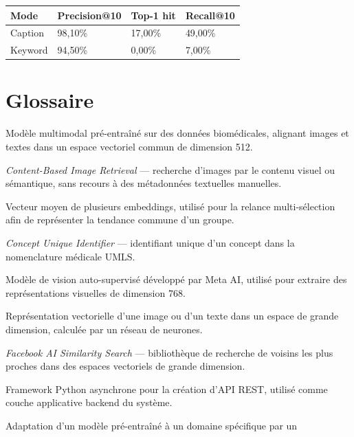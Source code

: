 \documentclass[12pt,a4paper]{article}
\begin{document}
\begin{center}
\begin{tabularx}{0.85\textwidth}{@{}lXXX@{}}
\toprule
\textbf{Mode} & \textbf{Precision@10} & \textbf{Top-1 hit} & \textbf{Recall@10} \\
\midrule
Caption  & 98,10\% & 17,00\% & 49,00\% \\
Keyword  & 94,50\% &  0,00\% &  7,00\% \\
\bottomrule
\end{tabularx}
\end{center}

\newpage
\section{Glossaire}
\begin{description}[leftmargin=7em, style=sameline]
  \item[BioMedCLIP] Modèle multimodal pré-entraîné sur des données biomédicales, alignant
                    images et textes dans un espace vectoriel commun de dimension 512.
  \item[CBIR]       \textit{Content-Based Image Retrieval} --- recherche d'images
                    par le contenu visuel ou sémantique, sans recours à des métadonnées
                    textuelles manuelles.
  \item[Centroïde]  Vecteur moyen de plusieurs embeddings, utilisé pour la relance
                    multi-sélection afin de représenter la tendance commune d'un groupe.
  \item[CUI]        \textit{Concept Unique Identifier} --- identifiant unique d'un concept
                    dans la nomenclature médicale UMLS.
  \item[DINOv2]     Modèle de vision auto-supervisé développé par Meta AI, utilisé pour
                    extraire des représentations visuelles de dimension 768.
  \item[Embedding]  Représentation vectorielle d'une image ou d'un texte dans un espace
                    de grande dimension, calculée par un réseau de neurones.
  \item[FAISS]      \textit{Facebook AI Similarity Search} --- bibliothèque de recherche
                    de voisins les plus proches dans des espaces vectoriels de grande dimension.
  \item[FastAPI]    Framework Python asynchrone pour la création d'API REST, utilisé comme
                    couche applicative backend du système.
  \item[Fine-tuning] Adaptation d'un modèle pré-entraîné à un domaine spécifique par un

\end{description}
\end{document}
